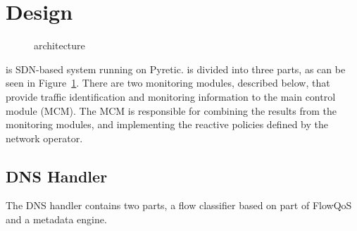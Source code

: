 \section{Design}


\begin{figure}
    \centering
    \caption{\system{} architecture}
    \label{fig:architecture}
\end{figure}


\system{} is SDN-based system running on Pyretic.\cite{pyretic} %
\system{} is divided into three parts, as can be seen in Figure~\ref{fig:architecture}. There are two monitoring modules, described below, that provide traffic identification and monitoring information to the main control module (MCM). %
The MCM is responsible for combining the results from the monitoring modules, and implementing the reactive policies defined by the network operator.



\subsection{DNS Handler}
The DNS handler contains two parts, a flow classifier based on part of FlowQoS~\cite{FlowQoS} and a metadata engine. %

